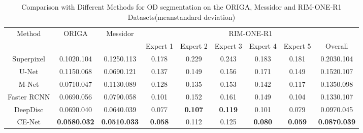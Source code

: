 \documentclass[journal]{IEEEtran}
\begin{document}
\begin{table*}[t]
	\normalsize
\caption{Comparison with Different Methods for OD segmentation on the ORIGA, Messidor and RIM-ONE-R1 Datasets(meanstandard deviation)}
\centering

\begin{tabular}{c|c|c|c|c|c|c|c|c}
\hline
\multirow{2}{*}{Method} & \multirow{2}{*}{ORIGA} & \multirow{2}{*}{Messidor} & \multicolumn{6}{c}{RIM-ONE-R1}                                                                                                                                                              \\ \cline{4-9} 
                  &                        &                           & \multicolumn{1}{l|}{Expert 1} & \multicolumn{1}{l|}{Expert 2} & \multicolumn{1}{l|}{Expert 3} & \multicolumn{1}{l|}{Expert 4} & \multicolumn{1}{l|}{Expert 5} & \multicolumn{1}{c}{Overall} \\ \hline
Superpixel\cite{cheng2013superpixel}        & 0.102{0.104}                 & 0.1250.113                     & 0.178                         & 0.229                         & 0.243                         & 0.183                         & 0.181                         & 0.2030.104                        \\ \hline
U-Net \cite{ronneberger2015u}            & 0.1150.068                & 0.0690.121                     & 0.137                         & 0.149                         & 0.156                         & 0.171                         & 0.149                         & 0.1520.107                        \\ \hline
M-Net\cite{fu2018joint}             & 0.0710.047                 & 0.1130.089                     & 0.128                         & 0.135                         & 0.153                         & 0.142                         & 0.117                         & 0.1350.098                        \\ \hline
Faster RCNN \cite{jiang2018optic}       & 0.0690.056                 &0.0790.058                           & 0.101                              & 0.152                              & 0.161                              &  0.149                             &  0.104                             & 0.1330.107        \\ \hline
DeepDisc \cite{gu2018deepdisc}         & 0.0690.040                 & 0.0640.039                     & 0.077                         & \textbf{0.107}                & \textbf{0.119}                & 0.101                         & 0.079                         &0.0970.045                       \\ \hline
CE-Net              & \textbf{0.0580.032}         & \textbf{0.0510.033}            & \textbf{0.058}                & 0.112                         & 0.125                         & \textbf{0.080}                & \textbf{0.059}                & \textbf{0.0870.039}               \\ \hline
\end{tabular}
\label{result-table}
\end{table*}
\end{document}
